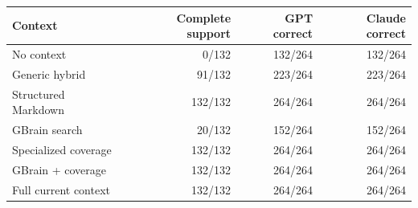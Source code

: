 \begin{tabular}{lrrr}
\toprule
Context & Complete support & GPT correct & Claude correct \\
\midrule
No context & 0/132 & 132/264 & 132/264 \\
Generic hybrid & 91/132 & 223/264 & 223/264 \\
Structured Markdown & 132/132 & 264/264 & 264/264 \\
GBrain search & 20/132 & 152/264 & 152/264 \\
Specialized coverage & 132/132 & 264/264 & 264/264 \\
GBrain + coverage & 132/132 & 264/264 & 264/264 \\
Full current context & 132/132 & 264/264 & 264/264 \\
\bottomrule
\end{tabular}
